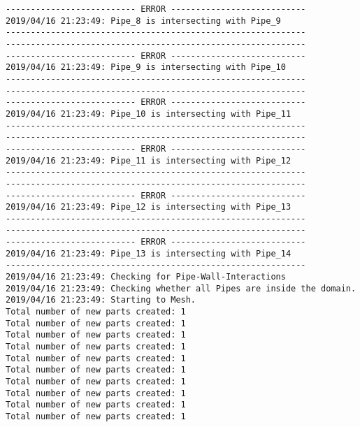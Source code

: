 \documentclass{article}
\begin{document}
{\begin{verbatim}
-------------------------- ERROR ---------------------------
2019/04/16 21:23:49: Pipe_8 is intersecting with Pipe_9
------------------------------------------------------------
------------------------------------------------------------
-------------------------- ERROR ---------------------------
2019/04/16 21:23:49: Pipe_9 is intersecting with Pipe_10
------------------------------------------------------------
------------------------------------------------------------
-------------------------- ERROR ---------------------------
2019/04/16 21:23:49: Pipe_10 is intersecting with Pipe_11
------------------------------------------------------------
------------------------------------------------------------
-------------------------- ERROR ---------------------------
2019/04/16 21:23:49: Pipe_11 is intersecting with Pipe_12
------------------------------------------------------------
------------------------------------------------------------
-------------------------- ERROR ---------------------------
2019/04/16 21:23:49: Pipe_12 is intersecting with Pipe_13
------------------------------------------------------------
------------------------------------------------------------
-------------------------- ERROR ---------------------------
2019/04/16 21:23:49: Pipe_13 is intersecting with Pipe_14
------------------------------------------------------------
2019/04/16 21:23:49: Checking for Pipe-Wall-Interactions
2019/04/16 21:23:49: Checking whether all Pipes are inside the domain.
2019/04/16 21:23:49: Starting to Mesh.
Total number of new parts created: 1
Total number of new parts created: 1
Total number of new parts created: 1
Total number of new parts created: 1
Total number of new parts created: 1
Total number of new parts created: 1
Total number of new parts created: 1
Total number of new parts created: 1
Total number of new parts created: 1
Total number of new parts created: 1
\end{verbatim}
}
\clearpage
\end{document}
